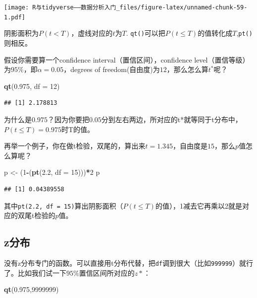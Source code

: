 \documentclass[]{book}
\newenvironment{Shaded}{\begin{snugshade}}{\end{snugshade}}
\newcommand{\DataTypeTok}[1]{\textcolor[rgb]{0.13,0.29,0.53}{#1}}
\newcommand{\DecValTok}[1]{\textcolor[rgb]{0.00,0.00,0.81}{#1}}
\newcommand{\FloatTok}[1]{\textcolor[rgb]{0.00,0.00,0.81}{#1}}
\newcommand{\KeywordTok}[1]{\textcolor[rgb]{0.13,0.29,0.53}{\textbf{#1}}}
\newcommand{\NormalTok}[1]{#1}
\newcommand{\OperatorTok}[1]{\textcolor[rgb]{0.81,0.36,0.00}{\textbf{#1}}}
\newcommand{\StringTok}[1]{\textcolor[rgb]{0.31,0.60,0.02}{#1}}
\begin{document}
\texttt{[image: R与tidyverse——数据分析入门\_files/figure-latex/unnamed-chunk-59-1.pdf]}

阴影面积为\(P(t<T)\)，虚线对应的\(t\)为\(T\).
\texttt{qt()}可以把\(P(t≤T)\)的值转化成\(T\),\texttt{pt()}则相反。

假设你需要算一个confidence interval（置信区间），confidence level（置信等级）为\(95\%\)，即\(\alpha=0.05\)，degrees of freedom(自由度)为\(12\)，那么怎么算\(t^*\)呢？

\begin{Shaded}
\begin{Highlighting}[]
\KeywordTok{qt}\NormalTok{(}\FloatTok{0.975}\NormalTok{, }\DataTypeTok{df =} \DecValTok{12}\NormalTok{)}
\end{Highlighting}
\end{Shaded}

\begin{verbatim}
## [1] 2.178813
\end{verbatim}

为什么是\(0.975\)？因为你要把\(0.05\)分到左右两边，所对应的t*就等同于t分布中，\(P(t ≤ T) = 0.975\)时T的值。

再举一个例子，你在做t检验，双尾的，算出来\(t=1.345\)，自由度是\(15\)，那么\(p\)值怎么算呢？

\begin{Shaded}
\begin{Highlighting}[]
\NormalTok{p <-}\StringTok{ }\NormalTok{(}\DecValTok{1}\OperatorTok{-}\NormalTok{(}\KeywordTok{pt}\NormalTok{(}\FloatTok{2.2}\NormalTok{, }\DataTypeTok{df =} \DecValTok{15}\NormalTok{)))}\OperatorTok{*}\DecValTok{2}
\NormalTok{p}
\end{Highlighting}
\end{Shaded}

\begin{verbatim}
## [1] 0.04389558
\end{verbatim}

其中\texttt{pt(2.2,\ df\ =\ 15)}算出阴影面积（\(P(t≤T)\)的值），1减去它再乘以2就是对应的双尾t检验的\(p\)值。

\hypertarget{z}{%
\subsection{z分布}\label{z}}

没有z分布专门的函数。可以直接用t分布代替，把\texttt{df}调到很大（比如\texttt{999999}）就行了。比如我们试一下\(95\%\)置信区间所对应的\(z*\)：

\begin{Shaded}
\begin{Highlighting}[]
\KeywordTok{qt}\NormalTok{(}\FloatTok{0.975}\NormalTok{,}\DecValTok{9999999}\NormalTok{)}
\end{Highlighting}
\end{Shaded}
\end{document}
